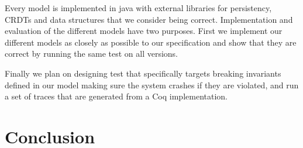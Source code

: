 \documentclass[systeme]{compas2022}
\begin{document}
Every model is implemented in java with external libraries for persistency, CRDTs and data structures that we consider being correct.
Implementation and evaluation of the different models have two purposes.
First we implement our different models as closely as possible to our specification and show that they are correct by running the same test on all versions.

Finally we plan on designing test that specifically targets breaking invariants defined in our model making sure the system crashes if they are violated, and run a set of traces that are generated from a Coq implementation.



\section{Conclusion}



\end{document}
